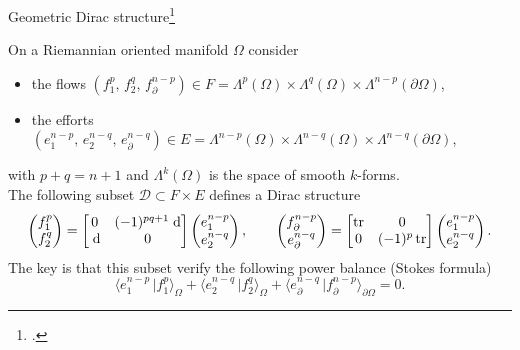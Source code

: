 \documentclass[aspectratio=169]{beamer}
\DeclareMathOperator{\tr}{tr}
\newcommand{\dualpr}[3][]{\ensuremath{\langle #2 \, \vert #3 \rangle_{#1}}}
\begin{document}
\begin{frame}{Geometric Dirac structure\footcite{vanderSchaft2002}}
	\begin{tcolorbox}[nobeforeafter, colframe=theme,title=Dirac structure for differential forms]%
	On a Riemannian oriented manifold $\Omega$ consider
	\begin{itemize}
		\item the flows $(f^p_1, \, f^q_2, \, f_\partial^{n-p}) \in F = \Lambda^p(\Omega) \times \Lambda^q(\Omega) \times \Lambda^{n-p}(\partial\Omega)$,
		\item the efforts $(e_1^{n-p}, \, e_2^{n-q}, \, e_\partial^{n-q}) \in E = \Lambda^{n-p}(\Omega) \times \Lambda^{n-q}(\Omega) \times \Lambda^{n-q}(\partial\Omega)$,
	\end{itemize}
	with $p+q=n+1$ and $\Lambda^k(\Omega)$ is the space of smooth $k$-forms. \\
	The following subset $\mathcal{D} \subset F \times E$ defines a Dirac structure
	\begin{equation*}
		\begin{pmatrix}
			{f}^p_1 \\
			{f}^q_2
		\end{pmatrix} = 
		\begin{bmatrix}
				0 & (-1)^{pq+1} \d \\
				\d & 0 \\
		\end{bmatrix}
		\begin{pmatrix}
			{e}^{n-p}_1 \\
			{e}^{n-q}_2
		\end{pmatrix}, \qquad 
		\begin{pmatrix}
			{f}_\partial^{n-p} \\
			{e}_\partial^{n-q}
		\end{pmatrix} = 
		\begin{bmatrix}
			\tr & 0 \\
			0 &  (-1)^p\tr
		\end{bmatrix}
		\begin{pmatrix}
			{e}^{n-p}_1 \\
			{e}^{n-q}_2
		\end{pmatrix}.
	\end{equation*}
The key is that this subset verify the following power balance (Stokes formula)
\begin{equation*}\label{eq:bal_eq}
	\dualpr[\Omega]{e^{n-p}_1}{{f}^p_1} + \dualpr[\Omega]{{e}^{n-q}_2}{f^q_2} + \dualpr[\partial\Omega]{{e}_\partial^{n-q}}{{f}_\partial^{n-p}} = 0.
\end{equation*}
\end{tcolorbox} 

	
\end{frame}
\end{document}
